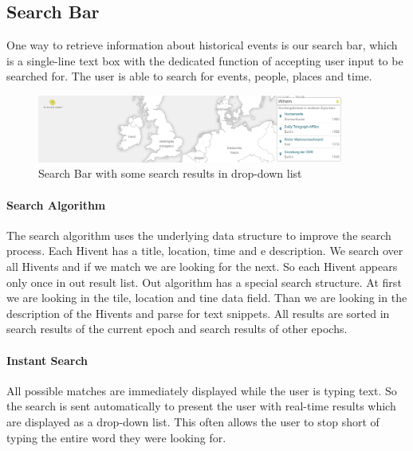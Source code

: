 \subsection{Search Bar} %
\label{sub:search_bar}

One way to retrieve information about historical events is our search bar, which is a single-line text box with the dedicated function of accepting user input to be searched for. The user is able to search for events, people, places and time.

\begin{figure}[H]
  \begin{center}
    \includegraphics[width=0.9\textwidth]{graphics/search.png}
  \end{center}
  \caption{Search Bar with some search results in drop-down list}
  \label{fig:search}
\end{figure}

\paragraph{Search Algorithm}
\label{par:search_alg}
The search algorithm uses the underlying data structure to improve the search process. Each Hivent has a title, location, time and e description. We search over all Hivents and if we match we are looking for the next. So each Hivent appears only once in out result list. Out algorithm has a special search structure. At first we are looking in the tile, location and tine data field. Than we are looking in the description of the Hivents and parse for text snippets. All results are sorted in search results of the current epoch and search results of other epochs.

\paragraph{Instant Search} %
\label{par:instant_search}
All possible matches are immediately displayed while the user is typing text. So the search is sent automatically to present the user with real-time results which are displayed as a drop-down list. This often allows the user to stop short of typing the entire word they were looking for.

